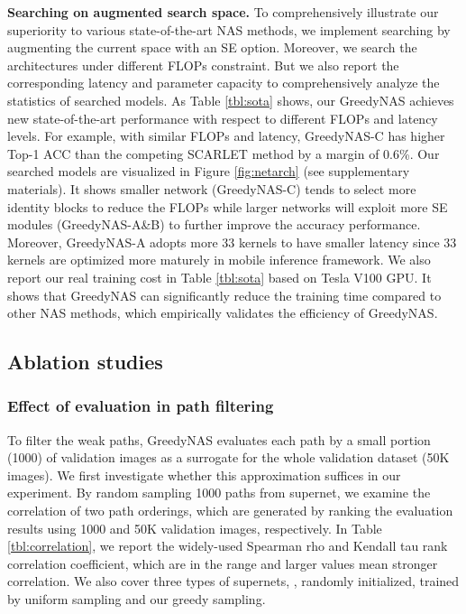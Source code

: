 \documentclass[10pt,twocolumn,letterpaper]{article}
\begin{document}
\textbf{Searching on augmented search space.} To comprehensively illustrate our superiority to various state-of-the-art NAS methods, we implement searching by augmenting the current space with an SE option. Moreover, we search the architectures under different FLOPs constraint. But we also report the corresponding latency and parameter capacity to comprehensively analyze the statistics of searched models. As Table \ref{tbl:sota} shows, our GreedyNAS achieves new state-of-the-art performance with respect to different FLOPs and latency levels. For example, with similar FLOPs and latency, GreedyNAS-C has higher Top-1 ACC than the competing SCARLET method by a margin of 0.6\%. Our searched models are visualized in Figure \ref{fig:netarch} (see supplementary materials). It shows smaller network (GreedyNAS-C) tends to select more identity blocks to reduce the FLOPs while larger networks will exploit more SE modules  (GreedyNAS-A\&B) to further improve the accuracy performance. Moreover, GreedyNAS-A adopts more 33 kernels to have smaller latency since 33 kernels are optimized more maturely in mobile inference framework. We also report our real training cost in Table \ref{tbl:sota} based on Tesla V100 GPU. It shows that GreedyNAS can significantly reduce the training time compared to other NAS methods, which empirically validates the efficiency of GreedyNAS.







\subsection{Ablation studies}


\subsubsection{Effect of evaluation in path filtering} \label{ablation1}
To filter the weak paths, GreedyNAS evaluates each path by a small portion (1000) of validation images as a surrogate for the whole validation dataset (50K images). We first investigate whether this approximation suffices in our experiment. By random sampling 1000 paths from supernet, we examine the correlation of two path orderings, which are generated by ranking the evaluation results using 1000 and 50K validation images, respectively. In Table \ref{tbl:correlation}, we report the widely-used Spearman rho \cite{pirie2004s} and Kendall tau \cite{tau} rank correlation coefficient, which are in the range  and larger values mean stronger correlation. We also cover three types of supernets, \ie, randomly initialized, trained by uniform sampling and our greedy sampling. 
\end{document}
